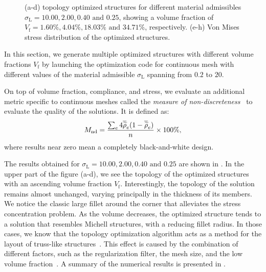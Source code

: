 \begin{figure}
    \hfill
    \hfill
    \caption{(a-d) topology optimized structures for different material admissibles $\sigma_\text{L}=10.00,2.00,0.40\text{ and }0.25$, showing a volume fraction of $V_\text{f}=1.60\%,4.04\%,18.03\%\text{ and }34.71\%$, respectively. (e-h) Von Mises stress distribution of the optimized structures.}
    \label{fig:03_to_sol}
\end{figure}
In this section, we generate multiple optimized structures with different volume fractions $V_\text{f}$ by launching the optimization code for continuous mesh with different values of the material admissible $\sigma_\text{L}$ spanning from $0.2$ to $20$.

On top of volume fraction, compliance, and stress, we evaluate an additional metric specific to continuous meshes called the \textit{measure of non-discreteness}~ to evaluate the quality of the solutions. It is defined as:
\begin{equation}
    M_\text{nd} = \frac{\sum_e 4 \overline{\widetilde{\rho}}_e(1-\overline{\widetilde{\rho}}_e)}{n} \times 100 \%,
\end{equation}
where results near zero mean a completely black-and-white design. 

The results obtained for $\sigma_\text{L}=10.00,2.00,0.40\text{ and }0.25$ are shown in . In the upper part of the figure (a-d), we see the topology of the optimized structures with an ascending volume fraction $V_\text{f}$. Interestingly, the topology of the solution remains almost unchanged, varying principally in the thickness of its members. We notice the classic large fillet around the corner that alleviates the stress concentration problem. As the volume decreases, the optimized structure tends to a solution that resembles Michell structures, with a reducing fillet radius. In those cases, we know that the topology optimization algorithm acts as a method for the layout of truss-like structures~. This effect is caused by the combination of different factors, such as the regularization filter, the mesh size, and the low volume fraction~. A summary of the numerical results is presented in .

